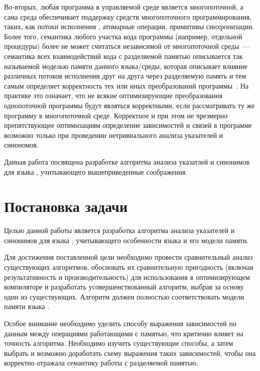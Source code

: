 \documentclass[14pt,titlepage,draft]{extarticle}
\newcommand{\java}{\eng{Java}\xspace}
\begin{document}
    Во-вторых, любая программа в управляемой среде является многопоточной, а
    сама среда обеспечивает поддержку средств многопоточного программирования,
    таких, как потоки исполнения , атомарные операции,
    примитивы синхронизации. Более того, семантика любого участка кода
    программы (например, отдельной процедуры) более не может считаться
    независимой от многопоточной среды~--- семантика всех взаимодействий кода с
    разделяемой памятью описывается так называемой моделью памяти данного
    языка/среды, которая описывает влияние различных потоков исполнения друг на
    друга через разделяемую память и тем самым определяет корректность тех или
    иных преобразований программы~\cite{manson_jmm}. На практике это означает,
    что не всякие оптимизирующие преобразования однопоточной программы будут
    являться корректными, если рассматривать ту же программу в многопоточной
    среде. Корректное и при этом не чрезмерно препятствующее оптимизациям
    определение зависимостей и связей в программе возможно только при
    проведении нетривиального анализа указателей и синономов.

    Данная работа посвящена разработке алгоритма анализа указатлей и синонимов
    для языка \java, учитывающего вышеприведенные соображения.

  \section{Постановка задачи}

    Целью данной работы является разработка алгоритма анализа указателей и
    синонимов для языка \java, учитывающего особенности языка и его модели
    памяти.

    Для достижения поставленной цели необходимо провести сравнительный анализ
    существующих алгоритмов, обосновать их сравнительную пригодность (включая
    результативность и производительность) для использования в оптимизирующем
    компиляторе и разработать усовершенствованный алгоритм, выбрав за основу
    один из существующих. Алгоритм должен полностью соответствовать модели
    памяти языка \java.

    Особое внимание необходимо уделить способу выражения зависимостей по
    данным между операциями работающими с памятью, что критично влияет на
    точность алгоритма. Необходимо изучить существующие способы, а затем
    выбрать и возможно доработать схему выражения таких зависимостей, чтобы она
    корректно отражала семантику работы с разделяемой памятью.
\end{document}
